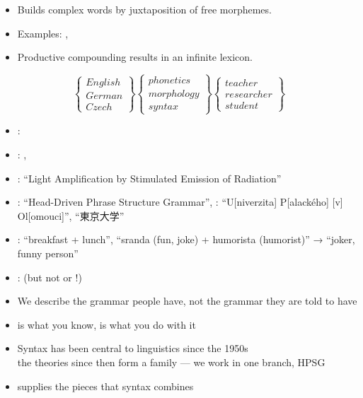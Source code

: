 \documentclass[a4paper,landscape,headrule,footrule]{foils}
\newcommand{\zh}[1]{{\cjkfont #1}}
\begin{document}
  \begin{itemize}
    \item Builds complex words by juxtaposition of free morphemes.
    \item Examples: , \eng{[dish]+[washer]}
    \item Productive compounding results in an infinite lexicon.
  \end{itemize}
  \medskip
  \[
    \left\{\begin{array}{l}
        English \\
        German \\
        Czech
      \end{array}
      \right\}
    \left\{\begin{array}{l}
        phonetics \\
        morphology \\
        syntax
      \end{array}
      \right\}
    \left\{\begin{array}{l}
        teacher \\
        researcher \\
        student
      \end{array}
      \right\}
  \]
 


\begin{itemize}
\item {}: 
\item {}: , 
\item {}:  ``Light Amplification by Stimulated Emission of Radiation''
\item {}:  ``Head-Driven Phrase Structure Grammar'', : ``U[niverzita] P[alackého] [v] Ol[omouci]'', \eng{\zh{東大}} ``\zh{東京大学}''
\item {}:  ``breakfast + lunch'',  ``sranda (fun, joke) + humorista (humorist)'' → ``joker, funny person''
\item {}:  (but not  or !)
\end{itemize}
  

\begin{itemize}
\item We describe the grammar people have, not the grammar they are told
  to have
\item {} is what you know,  is what you do
  with it
\item Syntax has been central to linguistics since the 1950s
  \\ the theories since then form a family --- we work in one branch, HPSG
\item {} supplies the pieces that syntax combines
\end{itemize}
\end{document}
